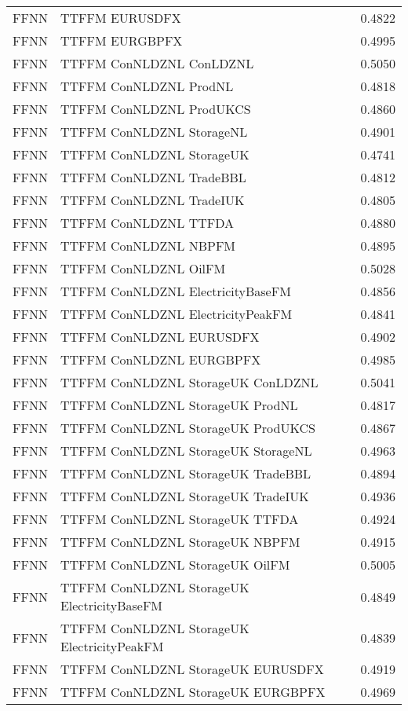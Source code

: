 \begin{table}[h!]
\begin{adjustbox}{max width=\textwidth}
\begin{tabular}{llr}
  FFNN & TTFFM EURUSDFX & 0.4822 \\ 
  FFNN & TTFFM EURGBPFX & 0.4995 \\ 
  FFNN & TTFFM ConNLDZNL ConLDZNL & 0.5050 \\ 
  FFNN & TTFFM ConNLDZNL ProdNL & 0.4818 \\ 
  FFNN & TTFFM ConNLDZNL ProdUKCS & 0.4860 \\ 
  FFNN & TTFFM ConNLDZNL StorageNL & 0.4901 \\ 
  FFNN & TTFFM ConNLDZNL StorageUK & 0.4741 \\ 
  FFNN & TTFFM ConNLDZNL TradeBBL & 0.4812 \\ 
  FFNN & TTFFM ConNLDZNL TradeIUK & 0.4805 \\ 
  FFNN & TTFFM ConNLDZNL TTFDA & 0.4880 \\ 
  FFNN & TTFFM ConNLDZNL NBPFM & 0.4895 \\ 
  FFNN & TTFFM ConNLDZNL OilFM & 0.5028 \\ 
  FFNN & TTFFM ConNLDZNL ElectricityBaseFM & 0.4856 \\ 
  FFNN & TTFFM ConNLDZNL ElectricityPeakFM & 0.4841 \\ 
  FFNN & TTFFM ConNLDZNL EURUSDFX & 0.4902 \\ 
  FFNN & TTFFM ConNLDZNL EURGBPFX & 0.4985 \\ 
  FFNN & TTFFM ConNLDZNL StorageUK ConLDZNL & 0.5041 \\ 
  FFNN & TTFFM ConNLDZNL StorageUK ProdNL & 0.4817 \\ 
  FFNN & TTFFM ConNLDZNL StorageUK ProdUKCS & 0.4867 \\ 
  FFNN & TTFFM ConNLDZNL StorageUK StorageNL & 0.4963 \\ 
  FFNN & TTFFM ConNLDZNL StorageUK TradeBBL & 0.4894 \\ 
  FFNN & TTFFM ConNLDZNL StorageUK TradeIUK & 0.4936 \\ 
  FFNN & TTFFM ConNLDZNL StorageUK TTFDA & 0.4924 \\ 
  FFNN & TTFFM ConNLDZNL StorageUK NBPFM & 0.4915 \\ 
  FFNN & TTFFM ConNLDZNL StorageUK OilFM & 0.5005 \\ 
  FFNN & TTFFM ConNLDZNL StorageUK ElectricityBaseFM & 0.4849 \\ 
  FFNN & TTFFM ConNLDZNL StorageUK ElectricityPeakFM & 0.4839 \\ 
  FFNN & TTFFM ConNLDZNL StorageUK EURUSDFX & 0.4919 \\ 
  FFNN & TTFFM ConNLDZNL StorageUK EURGBPFX & 0.4969 \\ 

\end{tabular}
\end{adjustbox}
\end{table}
